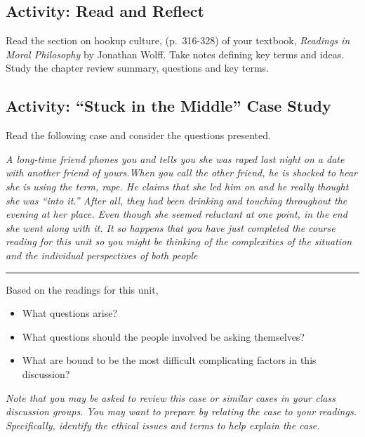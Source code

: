 \documentclass[
]{book}
\providecommand{\tightlist}{%
  \setlength{\itemsep}{0pt}\setlength{\parskip}{0pt}}
\begin{document}
\hypertarget{activity-read-and-reflect}{%
\subsection*{Activity: Read and Reflect}\label{activity-read-and-reflect}}

\begin{reflect}
Read the section on hookup culture, (p.~316-328) of your textbook, \emph{Readings in Moral Philosophy} by Jonathan Wolff. Take notes defining key terms and ideas. Study the chapter review summary, questions and key terms.
\end{reflect}

\hypertarget{activity-stuck-in-the-middle-case-study}{%
\subsection*{Activity: ``Stuck in the Middle'' Case Study}\label{activity-stuck-in-the-middle-case-study}}

\begin{reflect}
Read the following case and consider the questions presented.

\emph{A long-time friend phones you and tells you she was raped last night on a date with another friend of yours.When you call the other friend, he is shocked to hear she is using the term, rape. He claims that she led him on and he really thought she was ``into it.'' After all, they had been drinking and touching throughout the evening at her place. Even though she seemed reluctant at one point, in the end she went along with it. It so happens that you have just completed the course reading for this unit so you might be thinking of the complexities of the situation and the individual perspectives of both people}

\begin{center}\rule{0.5\linewidth}{0.5pt}\end{center}

Based on the readings for this unit,

\begin{itemize}
\tightlist
\item
  What questions arise?
\item
  What questions should the people involved be asking themselves?
\item
  What are bound to be the most difficult complicating factors in this discussion?
\end{itemize}

\emph{Note that you may be asked to review this case or similar cases in your class discussion groups. You may want to prepare by relating the case to your readings. Specifically, identify the ethical issues and terms to help explain the case.}
\end{reflect}
\end{document}
